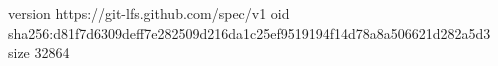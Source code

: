 version https://git-lfs.github.com/spec/v1
oid sha256:d81f7d6309deff7e282509d216da1c25ef9519194f14d78a8a506621d282a5d3
size 32864
